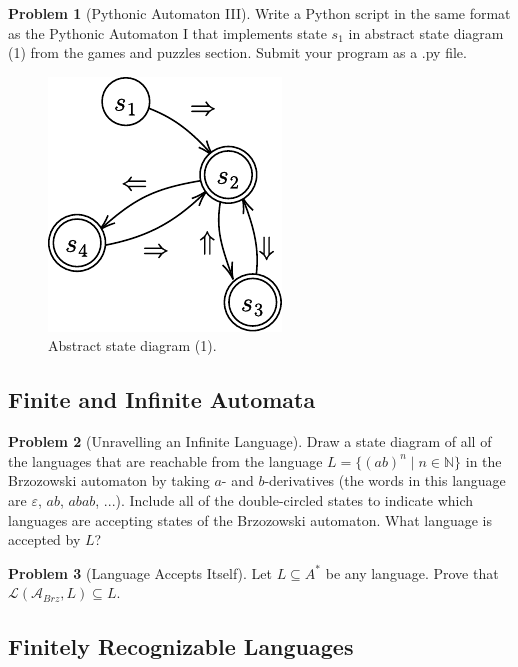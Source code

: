 \documentclass[11pt]{article}
\theoremstyle{theorem} %
\theoremstyle{definition} %
\newtheorem{problem}                    {{\color{BurntOrange}Problem}}
\theoremstyle{remark} %
\begin{document}
\begin{problem}
    [Pythonic Automaton III]
    Write a Python script in the same format as the Pythonic Automaton I that implements state \(s_1\) in abstract state diagram (1) from the games and puzzles section. 
    Submit your program as a .py file.

    \begin{figure}[h]
        \centering
        \includegraphics{../imgs/reverseengineering.pdf}
        \caption{Abstract state diagram (1).}
    \end{figure}
\end{problem}

\subsection*{Finite and Infinite Automata}

\begin{problem}
    [Unravelling an Infinite Language]
    Draw a state diagram of all of the languages that are reachable from the language \(L = \{(ab)^n \mid n \in \mathbb N\}\) in the Brzozowski automaton by taking \(a\)- and \(b\)-derivatives (the words in this language are \(\varepsilon\), \(ab\), \(abab\), ...). 
    Include all of the double-circled states to indicate which languages are accepting states of the Brzozowski automaton.
    What language is accepted by \(L\)?
\end{problem}

\begin{problem}
    [Language Accepts Itself]
    Let \(L \subseteq A^*\) be any language. 
    Prove that \(\mathcal L(\mathcal A_{Brz}, L) \subseteq L\).
\end{problem}

\subsection*{Finitely Recognizable Languages}
\end{document}
